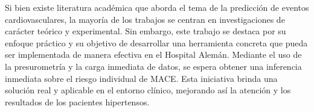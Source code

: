Si bien existe literatura académica que aborda el tema de la predicción de eventos cardiovasculares, 
la mayoría de los trabajos se centran en investigaciones de carácter teórico y experimental. Sin embargo, este trabajo 
se destaca por su enfoque práctico y su objetivo de desarrollar una herramienta concreta que pueda ser implementada 
de manera efectiva en el Hospital Alemán. Mediante el uso de la presurometría  y la carga inmediata de datos, se espera 
obtener una inferencia inmediata sobre el riesgo individual de MACE. Esta iniciativa brinda una solución real y 
aplicable en el entorno clínico, mejorando así la atención y los resultados de los pacientes hipertensos.